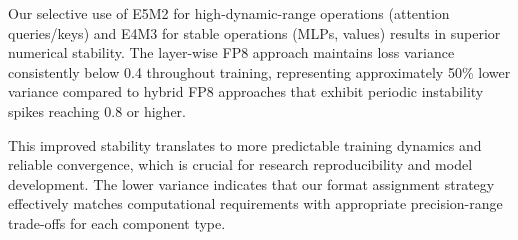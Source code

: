Our selective use of E5M2 for high-dynamic-range operations (attention queries/keys) and E4M3 for stable operations (MLPs, values) results in superior numerical stability. The layer-wise FP8 approach maintains loss variance consistently below 0.4 throughout training, representing approximately 50\% lower variance compared to hybrid FP8 approaches that exhibit periodic instability spikes reaching 0.8 or higher.

This improved stability translates to more predictable training dynamics and reliable convergence, which is crucial for research reproducibility and model development. The lower variance indicates that our format assignment strategy effectively matches computational requirements with appropriate precision-range trade-offs for each component type.
